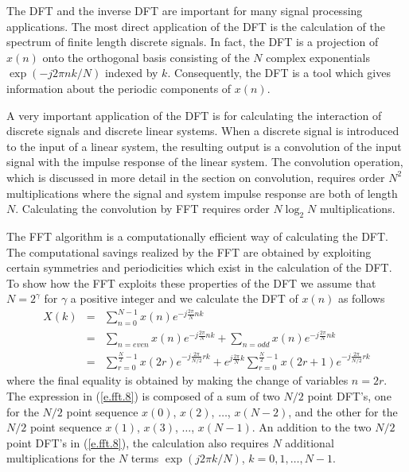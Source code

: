 	The DFT and the inverse DFT are
important for many signal processing applications.
The most direct application of the DFT is
the calculation of the spectrum of finite
length discrete signals.  In fact, the DFT 
is a projection of $x(n)$ onto the orthogonal
basis consisting of the $N$ complex
exponentials $\exp(-j2\pi nk/N)$ indexed by $k$.
Consequently, the DFT is a tool which gives
information about the periodic components of $x(n)$.

	A very important application of the DFT
is for calculating the interaction of discrete
signals and discrete linear systems.  When a
discrete signal is introduced to the input of a
linear system, the resulting output is a convolution
of the input signal with the impulse response of
the linear system.  The convolution operation, which
is discussed in more detail in the section
on convolution, requires order $N^2$ multiplications where
the signal and system impulse response are both of length $N$.
Calculating the convolution by FFT requires order
$N\log_2N$ multiplications.

	The FFT algorithm is a computationally
efficient way of calculating the DFT.  The computational
savings realized by the FFT are obtained by
exploiting certain symmetries and periodicities which exist in the
calculation of the DFT.  To show how the FFT
exploits these properties of the DFT we assume that $N=2^{\gamma}$
for $\gamma$ a positive integer and we calculate
the DFT of $x(n)$ as follows
%
\begin{eqnarray}
X(k)&=&\sum_{n=0}^{N-1}x(n)e^{-j\frac{2\pi}{N}nk}\nonumber\\
    &=&\sum_{n=even}x(n)e^{-j\frac{2\pi}{N}nk}+\sum_{n=odd}x(n)e^{-j\frac{2\pi}{N}nk}\nonumber\\
    &=&\sum_{r=0}^{\frac{N}{2}-1}x(2r)e^{-j\frac{2\pi}{N/2}rk}+e^{j\frac{2\pi}{N}k}\sum_{r=0}^{\frac{N}{2}-1}x(2r+1)e^{-j\frac{2\pi}{N/2}rk}
\label{e.fft.8}
\end{eqnarray}
%
where the final equality is obtained by making
the change of variables $n=2r$.  The expression in (\ref{e.fft.8})
is composed of a sum of two $N/2$ point DFT's, 
one for the $N/2$ point sequence $x(0)$, $x(2)$, $\ldots$, $x(N-2)$,
and the other for the $N/2$ point sequence $x(1)$, $x(3)$, $\ldots$, $x(N-1)$.
An addition to the two $N/2$ point DFT's in (\ref{e.fft.8}), the
calculation also requires $N$ additional multiplications
for the $N$ terms $\exp(j2\pi k/N)$, $k=0,1,\ldots,N-1$.

